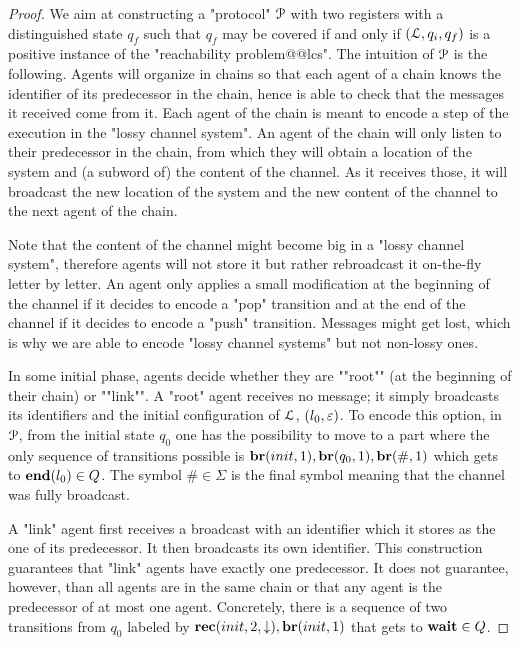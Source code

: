 \begin{proof}
	We aim at constructing a "protocol" $\mathcal{P}$ with two registers with a distinguished state $q_f$ such that $q_f$ may be covered if and only if $(\mathcal{L}, q_i, q_f)$ is a positive instance of the "reachability problem@@lcs". 
	The intuition of $\mathcal{P}$ is the following. Agents will organize in chains so that each agent of a chain knows the identifier of its predecessor in the chain, hence is able to check that the messages it received come from it. Each agent of the chain is meant to encode a step of the execution in the "lossy channel system". 
	An agent of the chain will only listen to their predecessor in the chain, from which they will obtain a location of the system and (a subword of) the content of the channel. As it receives those, it will broadcast the new location of the system and the new content of the channel to the next agent of the chain. 
	
	Note that the content of the channel might become big in a "lossy channel system", therefore agents will not store it but rather rebroadcast it on-the-fly letter by letter. An agent only applies a small modification at the beginning of the channel if it decides to encode a "pop" transition and at the end of the channel if it decides to encode a "push" transition. Messages might get lost, which is why we are able to encode "lossy channel systems" but not non-lossy ones.
	
	\AP In some initial phase, agents decide whether they are ""root"" (at the beginning of their chain) or ""link"". A "root" agent receives no message; it simply broadcasts its identifiers and the initial configuration of $\mathcal{L}$, $(l_0,\varepsilon)$. To encode this option, in $\mathcal{P}$, from the initial state $q_0$ one has the possibility to move to a part where the only sequence of transitions possible is $\br{\mathsf{init}}{1}, \br{\mathsf{q_0}}{1}, \br{\mathsf{\#}}{1}$ which gets to $\mathbf{end}(l_0) \in Q$. The symbol $\mathsf{\#} \in \Sigma$ is the final symbol meaning that the channel was fully broadcast. 
	
	A "link" agent first receives a broadcast with an identifier which it stores as the one of its predecessor. It then broadcasts its own identifier. This construction guarantees that "link" agents have exactly one predecessor. It does not guarantee, however, than all agents are in the same chain or that any agent is the predecessor of at most one agent. Concretely, there is a sequence of two transitions from $q_0$ labeled by $\rec{\mathsf{init}}{2}{\enregact}, \br{\mathsf{init}}{1}$ that gets to $\mathbf{wait} \in Q$. 
	

\end{proof}
